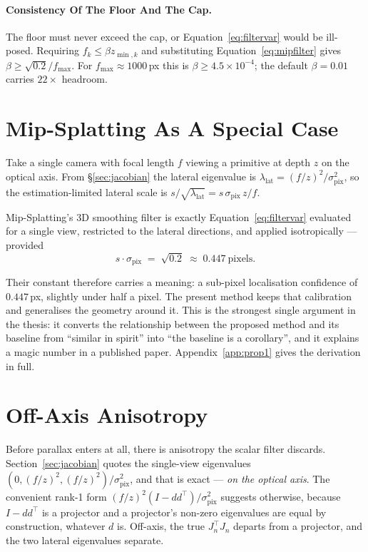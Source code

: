 \paragraph{Consistency Of The Floor And The Cap.} The floor must never exceed the
cap, or Equation~\eqref{eq:filtervar} would be ill-posed. Requiring
$f_k \le \beta z_{\min,k}$ and substituting Equation~\eqref{eq:mipfilter} gives
$\beta \ge \sqrt{0.2}/f_{\max}$. For $f_{\max}\approx1000$\,px this is
$\beta \ge 4.5\times10^{-4}$; the default $\beta=0.01$ carries $22\times$
headroom.

\section{Mip-Splatting As A Special Case}
\label{sec:proposition1}
Take a single camera with focal length $f$ viewing a primitive at depth $z$ on
the optical axis. From \S\ref{sec:jacobian} the lateral eigenvalue is
$\lambda_{\mathrm{lat}} = (f/z)^2/\sigma_{\mathrm{pix}}^2$, so the
estimation-limited lateral scale is $s/\sqrt{\lambda_{\mathrm{lat}}} =
s\,\sigma_{\mathrm{pix}}\,z/f$.

\begin{proposition}
\label{prop:constant}
Mip-Splatting's 3D smoothing filter is exactly Equation~\eqref{eq:filtervar}
evaluated for a single view, restricted to the lateral directions, and applied
isotropically --- provided
\[ s\cdot\sigma_{\mathrm{pix}} \;=\; \sqrt{0.2} \;\approx\; 0.447\ \text{pixels}. \]
\end{proposition}

Their constant therefore carries a meaning: a sub-pixel localisation confidence
of $0.447$\,px, slightly under half a pixel. The present method keeps
that calibration and generalises the geometry around it. This is the strongest
single argument in the thesis: it converts the relationship between the proposed
method and its baseline from ``similar in spirit'' into ``the baseline is a
corollary'', and it explains a magic number in a published paper.
Appendix~\ref{app:prop1} gives the derivation in full.

\section{Off-Axis Anisotropy}
\label{sec:offaxis}

Before parallax enters at all, there is anisotropy the scalar filter discards.
Section~\ref{sec:jacobian} quotes the single-view eigenvalues
$(0, (f/z)^2, (f/z)^2)/\sigma_{\mathrm{pix}}^2$, and that is exact --- \emph{on
the optical axis}. The convenient rank-1 form
$(f/z)^2(I - dd^{\!\top})/\sigma_{\mathrm{pix}}^2$ suggests otherwise, because
$I - dd^{\!\top}$ is a projector and a projector's non-zero eigenvalues are equal
by construction, whatever $d$ is. Off-axis, the true $J_n^{\!\top}J_n$ departs from a projector, and the two
lateral eigenvalues separate.

